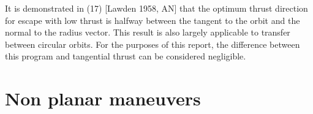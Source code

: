 \begin{displayquote}
It is demonstrated in (17) [Lawden 1958, AN] that the optimum thrust direction for escape with low thrust is halfway between the tangent to the orbit and the normal to the radius vector. This result is also largely applicable to transfer between circular orbits. For the purposes of this report, the difference between this program and tangential thrust can be considered negligible.
\end{displayquote}

\section{Non planar maneuvers} \label{metnonplanar}

\clearpage